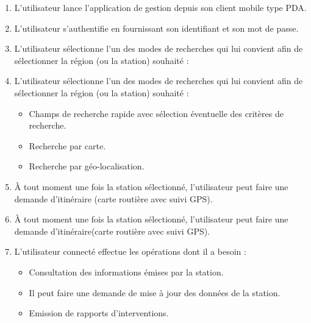 \begin{enumerate}
\item L'utilisateur lance l'application de gestion depuis son client mobile type PDA.\\
\item L'utilisateur s'authentifie en fournissant son identifiant et son mot de passe.\\

\item L'utilisateur sélectionne l'un des modes de recherches qui lui convient afin de sélectionner
 la région (ou la station) souhaité :\\

\item L'utilisateur sélectionne l'un des modes de recherches qui lui convient afin de sélectionner la région (ou la station) souhaité :\\

	\begin{itemize}
	\item Champs de recherche rapide avec sélection éventuelle des critères de recherche.\\

	\item Recherche par carte.\\

	\item Recherche par géo-localisation.\\
	
	\end{itemize}


	\item À tout moment une fois la station sélectionné, l'utilisateur peut faire une demande 
	d'itinéraire (carte routière avec suivi GPS).\\

	\item À tout moment une fois la station sélectionné, l'utilisateur peut faire une demande d'itinéraire(carte routière avec suivi GPS).\\

	\item L'utilisateur connecté effectue les opérations dont il a besoin :\\
	
	\begin{itemize}
	\item Consultation des informations émises par la station. \\
	\item Il peut faire une demande de mise à jour des données de la station.\\
	\item Emission de rapports d'interventions.\\


\end{itemize}
\end{enumerate}
